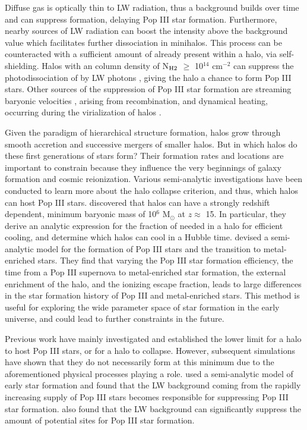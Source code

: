 \documentclass[fleqn,usenatbib]{mnras}
\begin{document}
Diffuse gas is optically thin to LW radiation, thus a background builds over time and can suppress \hh{} formation, delaying Pop III star formation. Furthermore, nearby sources of LW radiation can boost the intensity above the background value which facilitates further \hh{} dissociation in minihalos. This process can be counteracted with a sufficient amount of \hh{} already present within a halo, via \hh{} self-shielding. Halos with an \hh{} column density of N$_{\rm H2}$ $\geq$ 10$^{14}$ cm$^{-2}$ can suppress the photodissociation of \hh{} by LW photons \citep{Draine96}, giving the halo a chance to form Pop III stars. Other sources of the suppression of Pop III star formation are streaming baryonic velocities \citep{Tselia11, Greif11_Delay, Naoz12,OLeary12}, arising from recombination, and dynamical heating, occurring during the virialization of halos \citep{Yoshida03, Fernandez14}. 

Given the paradigm of hierarchical structure formation, halos grow through smooth accretion and successive mergers of smaller halos. But in which halos do these first generations of stars form? Their formation rates and locations are important to constrain because they influence the very beginnings of galaxy formation and cosmic reionization. Various semi-analytic investigations have been conducted to learn more about the halo collapse criterion, and thus, which halos can host Pop III stars. \citet{Tegmark97} discovered that halos can have a strongly redshift dependent, minimum baryonic mass of 10$^{6}$ M$_{\odot}$ at $z \approx$ 15. In particular, they derive an analytic expression for the fraction of \hh{} needed in a halo for efficient cooling, and determine which  halos can cool in a Hubble time. \citet{Visbal18} devised a semi-analytic model for the formation of Pop III stars and the transition to metal-enriched stars. They find that varying the Pop III star formation efficiency, the time from a Pop III supernova to metal-enriched star formation, the external enrichment of the halo, and the ionizing escape fraction, leads to large differences in the star formation history of Pop III and metal-enriched stars. This method is useful for exploring the wide parameter space of star formation in the early universe, and could lead to further constraints in the future. 

Previous work have mainly investigated and established the lower limit for a halo to host Pop III stars, or for a halo to collapse. However, subsequent simulations have shown that they do not necessarily form at this minimum due to the aforementioned physical processes playing a role. \citet{Mebane18} used a semi-analytic model of early star formation and found that the LW background coming from the rapidly increasing supply of Pop III stars becomes responsible for suppressing Pop III star formation. \citet{Griffen18} also found that the LW background can significantly suppress the amount of potential sites for Pop III star formation. 
\end{document}

